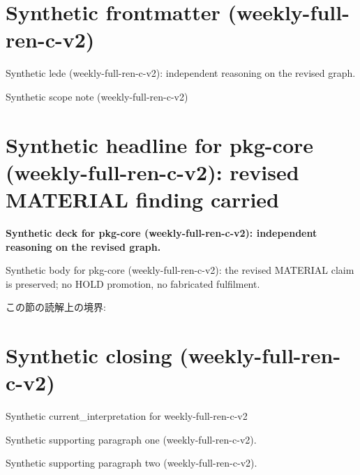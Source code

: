 \documentclass[lualatex,a4paper,10pt]{jlreq}
\begin{document}
\surveycover
\clearpage
\section*{Synthetic frontmatter (weekly-full-ren-c-v2)}
Synthetic lede (weekly-full-ren-c-v2): independent reasoning on the revised graph.

\begin{claimboundary}
\noindent Synthetic scope note (weekly-full-ren-c-v2)\par
\end{claimboundary}
\clearpage
\twocolumn
\section{Synthetic headline for pkg-core (weekly-full-ren-c-v2): revised MATERIAL finding carried}
\label{pkg:pkg-core}
\noindent\textbf{Synthetic deck for pkg-core (weekly-full-ren-c-v2): independent reasoning on the revised graph.} \cite{w2026-W33target-source}\par\medskip
\noindent Synthetic body for pkg-core (weekly-full-ren-c-v2): the revised MATERIAL claim is preserved; no HOLD promotion, no fabricated fulfilment.\par\medskip
\begin{claimboundary}
この節の読解上の境界: 
\end{claimboundary}
\clearpage
\onecolumn
\section{Synthetic closing (weekly-full-ren-c-v2)}
\label{sec:issue-summary}
\noindent Synthetic current\_interpretation for weekly-full-ren-c-v2\par\medskip
\noindent Synthetic supporting paragraph one (weekly-full-ren-c-v2).\par\medskip
\noindent Synthetic supporting paragraph two (weekly-full-ren-c-v2).\par\medskip
\clearpage
\onecolumn
\printbibliography[title={References / Source Notes}]
\end{document}

